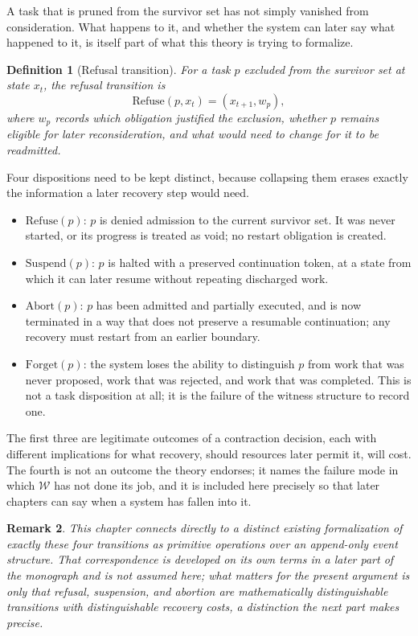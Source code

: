 \documentclass[11pt]{report}
\newtheorem{definition}{Definition}[chapter]
\newtheorem{remark}[definition]{Remark}
\newcommand{\Refuse}{\mathrm{Refuse}}
\newcommand{\Suspend}{\mathrm{Suspend}}
\newcommand{\Abort}{\mathrm{Abort}}
\newcommand{\Forget}{\mathrm{Forget}}
\begin{document}
A task that is pruned from the survivor set has not simply vanished from consideration. What happens to it, and whether the system can later say what happened to it, is itself part of what this theory is trying to formalize.

\begin{definition}[Refusal transition]
For a task $p$ excluded from the survivor set at state $x_t$, the refusal transition is
\[
\Refuse(p, x_t) = (x_{t+1}, w_p),
\]
where $w_p$ records which obligation justified the exclusion, whether $p$ remains eligible for later reconsideration, and what would need to change for it to be readmitted.
\end{definition}

Four dispositions need to be kept distinct, because collapsing them erases exactly the information a later recovery step would need.

\begin{itemize}[leftmargin=2em]
\item $\Refuse(p)$: $p$ is denied admission to the current survivor set. It was never started, or its progress is treated as void; no restart obligation is created.
\item $\Suspend(p)$: $p$ is halted with a preserved continuation token, at a state from which it can later resume without repeating discharged work.
\item $\Abort(p)$: $p$ has been admitted and partially executed, and is now terminated in a way that does not preserve a resumable continuation; any recovery must restart from an earlier boundary.
\item $\Forget(p)$: the system loses the ability to distinguish $p$ from work that was never proposed, work that was rejected, and work that was completed. This is not a task disposition at all; it is the failure of the witness structure to record one.
\end{itemize}

The first three are legitimate outcomes of a contraction decision, each with different implications for what recovery, should resources later permit it, will cost. The fourth is not an outcome the theory endorses; it names the failure mode in which $\mathcal W$ has not done its job, and it is included here precisely so that later chapters can say when a system has fallen into it.

\begin{remark}
This chapter connects directly to a distinct existing formalization of exactly these four transitions as primitive operations over an append-only event structure. That correspondence is developed on its own terms in a later part of the monograph and is not assumed here; what matters for the present argument is only that refusal, suspension, and abortion are mathematically distinguishable transitions with distinguishable recovery costs, a distinction the next part makes precise.
\end{remark}
\end{document}
